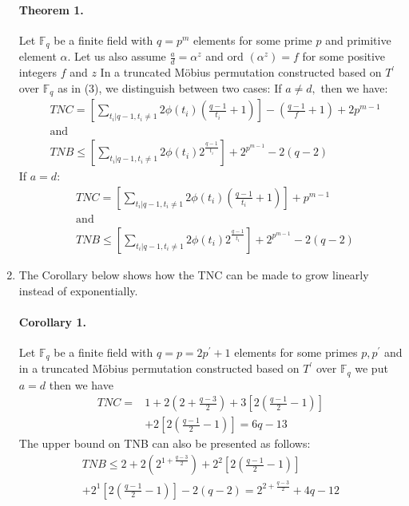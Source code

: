 \documentclass[fontsize=12pt]{article}
\begin{document}
\begin{enumerate}
\paragraph{Theorem 1. \newline} Let $\mathbb{F}_{q}$ be a finite field with $q=p^{m}$ elements for some prime $p$ and primitive element $\alpha .$ Let us also assume $\frac{a}{d}=\alpha^{z}$ and ord $\left(\alpha^{z}\right)=f$ for some positive integers $f$ and $z$ In a truncated Möbius permutation constructed based on $T^{\prime}$ over $\mathbb{F}_{q}$ as in (3), we distinguish between two cases:
If $a \neq d,$ then we have:
\begin{equation}
\begin{split}
&T N C=\left[\sum_{t_{i} | q-1, t_{i} \neq 1} 2 \phi\left(t_{i}\right)\left(\frac{q-1}{t_{i}}+1\right)\right] -\left(\frac{q-1}{f}+1\right)+2 p^{m-1}\\
&\text{and}\\
&T N B \leq\left[\sum_{t_{i} | q-1, t_{i} \neq 1} 2 \phi\left(t_{i}\right) 2^{\frac{q-1}{t_{i}}}\right]+2^{p^{m-1}}-2(q-2)
\end{split}
\end{equation}
If $a=d:$
\begin{equation}
\begin{split}
&TNC=\left[\sum_{t_{i} | q-1, t_{i} \neq 1} 2 \phi\left(t_{i}\right)\left(\frac{q-1}{t_{i}}+1\right)\right]+p^{m-1}\\
&\text{and}\\
&TNB \leq\left[\sum_{t_{i} | q-1, t_{i} \neq 1} 2 \phi\left(t_{i}\right) 2^{\frac{q-1}{t_{i}}}\right]+2^{p^{m-1}}-2(q-2)
\end{split}
\end{equation}

\item The Corollary below shows how the TNC can be made to grow linearly instead of exponentially.

\paragraph{Corollary 1. \newline} Let $\mathbb{F}_{q}$ be a finite field with $q=p=2 p^{\prime}+1$ elements for some primes $p, p^{\prime}$ and in a truncated Möbius permutation constructed based on $T^{\prime}$ over $\mathbb{F}_{q}$ we put $a=d$
then we have
\[
\begin{aligned}
T N C=&1+2\left(2+\frac{q-3}{2}\right)+3\left[2\left(\frac{q-1}{2}-1\right)\right] \\
&+2\left[2\left(\frac{q-1}{2}-1\right)\right]=6 q-13
\end{aligned}
\]
The upper bound on TNB can also be presented as follows:
\[
\begin{array}{c}
T N B \leq 2+2\left(2^{1+\frac{q-3}{2}}\right)+2^{2}\left[2\left(\frac{q-1}{2}-1\right)\right] \\
+2^{1}\left[2\left(\frac{q-1}{2}-1\right)\right]-2(q-2)=2^{2+\frac{q-3}{2}}+4 q-12
\end{array}
\]
\end{enumerate}
\end{document}
